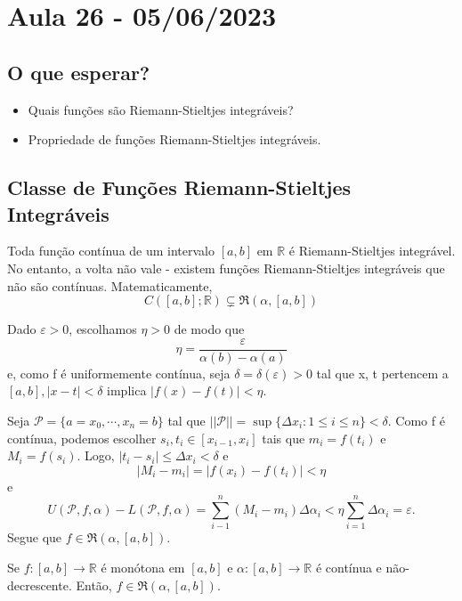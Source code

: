 \documentclass[analysis_notes.tex]{subfiles}
\begin{document}
\section{Aula 26 - 05/06/2023}
\subsection{O que esperar?}
\begin{itemize}
	\item Quais fun\c cões são Riemann-Stieltjes integráveis?
	\item Propriedade de fun\c cões Riemann-Stieltjes integráveis.
\end{itemize}
\subsection{Classe de Fun\c cões Riemann-Stieltjes Integráveis}
\begin{theorem*}
	Toda fun\c cão contínua de um intervalo \([a, b]\) em \(\mathbb{R}\) é Riemann-Stieltjes
	integrável. No entanto, a volta não vale - existem fun\c cões Riemann-Stieltjes integráveis que
	não são contínuas. Matematicamente,
	\[
		C([a, b]; \mathbb{R})\subsetneq{\mathfrak{R}(\alpha , [a,b])}
	\]
\end{theorem*}
\begin{proof*}
	Dado \(\varepsilon >0\), escolhamos \(\eta >0\) de modo que
	\[
		\eta = \frac{\varepsilon }{\alpha (b) - \alpha (a)}
	\]
	e, como f é uniformemente contínua, seja \(\delta =\delta (\varepsilon ) > 0\) tal que
	x, t pertencem a \([a, b], |x-t| < \delta \) implica \(|f(x)-f(t)| < \eta \).

	Seja \(\mathcal{P} = \{a=x_{0}, \cdots, x_{n} =b \}\) tal que \(||\mathcal{P}||=\sup\{\Delta x_{i}: 1\leq i\leq n\} < \delta.\)
	Como f é contínua, podemos escolher \(s_{i},t_{i}\in[x_{i-1}, x_{i}]\) tais que
	\(m_{i}=f(t_{i})\) e \(M_{i}=f(s_{i})\). Logo, \(|t_{i}-s_{i}|\leq \Delta x_{i} < \delta \) e
	\[
		|M_{i}-m_{i}| = |f(x_{i}) - f(t_{i})| < \eta
	\]
	e
	\[
		U(\mathcal{P}, f, \alpha ) - L(\mathcal{P}, f, \alpha ) = \sum\limits_{i-1}^{n}(M_{i}-m_{i})\Delta \alpha_{i} < \eta \sum\limits_{i=1}^{n}\Delta \alpha_{i} = \varepsilon .
	\]
	Segue que \(f\in \mathfrak{R}(\alpha , [a, b]).\) \qedsymbol
\end{proof*}
\begin{theorem*}
	Se \(f:[a, b]\rightarrow \mathbb{R}\) é monótona em \([a, b]\) e \(\alpha :[a, b]\rightarrow \mathbb{R}\) é
	contínua e não-decrescente. Então, \(f\in \mathfrak{R}(\alpha, [a,b]).\)
\end{theorem*}
\end{document}
